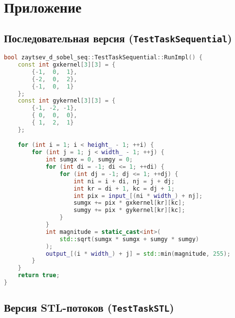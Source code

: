 \documentclass[12pt]{article}
\begin{document}
\newpage
\appendix
\section{Приложение}

\subsection{Последовательная версия (\texttt{TestTaskSequential})}

\begin{lstlisting}[language=C++, caption={Последовательная реализация оператора Собеля}]
bool zaytsev_d_sobel_seq::TestTaskSequential::RunImpl() {
    const int gxkernel[3][3] = {
        {-1,  0,  1},
        {-2,  0,  2},
        {-1,  0,  1}
    };
    const int gykernel[3][3] = {
        {-1, -2, -1},
        { 0,  0,  0},
        { 1,  2,  1}
    };

    for (int i = 1; i < height_ - 1; ++i) {
        for (int j = 1; j < width_ - 1; ++j) {
            int sumgx = 0, sumgy = 0;
            for (int di = -1; di <= 1; ++di) {
                for (int dj = -1; dj <= 1; ++dj) {
                    int ni = i + di, nj = j + dj;
                    int kr = di + 1, kc = dj + 1;
                    int pix = input_[(ni * width_) + nj];
                    sumgx += pix * gxkernel[kr][kc];
                    sumgy += pix * gykernel[kr][kc];
                }
            }
            int magnitude = static_cast<int>(
                std::sqrt(sumgx * sumgx + sumgy * sumgy)
            );
            output_[(i * width_) + j] = std::min(magnitude, 255);
        }
    }
    return true;
}
\end{lstlisting}

\subsection{Версия STL-потоков (\texttt{TestTaskSTL})}
\end{document}
